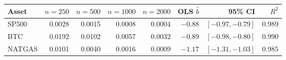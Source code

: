 \begin{tabular}{lrrrrrrr}
\toprule
Asset & $n{=}250$ & $n{=}500$ & $n{=}1000$ & $n{=}2000$ & OLS $\hat{b}$ & 95\% CI & $R^2$ \\
\midrule
  SP500 & 0.0028 & 0.0015 & 0.0008 & 0.0004 & $-0.88$ & $[-0.97, -0.79]$ & $0.989$ \\
  BTC & 0.0192 & 0.0102 & 0.0057 & 0.0032 & $-0.89$ & $[-0.98, -0.80]$ & $0.990$ \\
  NATGAS & 0.0101 & 0.0040 & 0.0016 & 0.0009 & $-1.17$ & $[-1.31, -1.03]$ & $0.985$ \\
\bottomrule
\end{tabular}